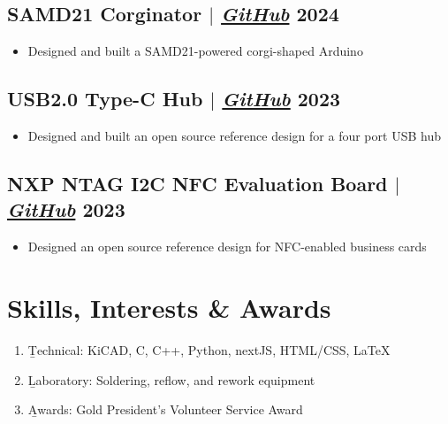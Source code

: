 \documentclass[11pt]{article}
\begin{document}
\subsection{SAMD21 Corginator {\normalfont $|$ \href{https://github.com/Hugoyhu/SAMD21-Corginator}{\textit{GitHub}}} \hfill 2024}
\begin{itemize}
    \item Designed and built a SAMD21-powered corgi-shaped Arduino
\end{itemize}

\subsection{USB2.0 Type-C Hub {\normalfont $|$ \href{https://github.com/Hugoyhu/SL2.1A-Type-C-Hub}{\textit{GitHub}}} \hfill 2023}
\begin{itemize}
    \item Designed and built an open source reference design for a four port USB hub
\end{itemize}

\subsection{NXP NTAG I2C NFC Evaluation Board {\normalfont $|$ \href{https://github.com/Hugoyhu/NTAG-I2C-Eval-Board}{\textit{GitHub}}} \hfill 2023}
\begin{itemize}
    \item Designed an open source reference design for NFC-enabled business cards
\end{itemize}

\section{Skills, Interests \& Awards}
\begin{enumerate}[itemsep=0pt]
  \item \b{Technical}: KiCAD, C, C++, Python, nextJS, HTML/CSS, LaTeX
  \item \b{Laboratory}: Soldering, reflow, and rework equipment 
  \item \b{Awards}: Gold President's Volunteer Service Award
\end{enumerate}
\end{document}
